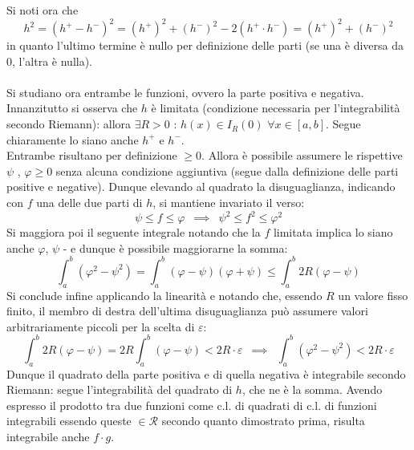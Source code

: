\documentclass[10pt, oneside]{book}
\theoremstyle{plain}
\begin{document}
Si noti ora che 
\[h^2 = (h^+ - h^-)^2 = (h^+)^2 + (h^-)^2 - 2 (h^+ \cdot h^-) = (h^+)^2 + (h^-)^2\]
in quanto l'ultimo termine è nullo per definizione delle parti (se una è diversa da $0$, l'altra è nulla).\\~\\
Si studiano ora entrambe le funzioni, ovvero la parte positiva e negativa.
\\Innanzitutto si osserva che $h$ è limitata (condizione necessaria per l'integrabilità secondo Riemann): allora $\exists R > 0$ : $h(x) \in I_R(0)$ $\forall x \in [a,b]$. Segue chiaramente lo siano anche $h^+$ e $h^-$. 
\\Entrambe risultano per definizione $\geq 0$. Allora è possibile assumere le rispettive $\psi$ , $\varphi \geq 0$ senza alcuna condizione aggiuntiva (segue dalla definizione delle parti positive e negative). Dunque elevando al quadrato la disuguaglianza, indicando con $f$ una delle due parti di $h$, si mantiene invariato il verso:
\[\psi \leq f \leq \varphi \enspace \implies \enspace \psi^2 \leq f^2 \leq \varphi^2\]
Si maggiora poi il seguente integrale notando che la $f$ limitata implica lo siano anche $\varphi$, $\psi$ - e dunque è possibile maggiorarne la somma:
\[\int_a^b (\varphi^2 - \psi^2) = \int_a^b(\varphi - \psi) (\varphi + \psi) \leq \int_a^b 2R (\varphi - \psi)\]
Si conclude infine applicando la linearità e notando che, essendo $R$ un valore fisso finito, il membro di destra dell'ultima disuguaglianza può assumere valori arbitrariamente piccoli per la scelta di $\varepsilon$:
\[\int_a^b 2R (\varphi - \psi) = 2R \int_a^b (\varphi - \psi) < 2R \cdot \varepsilon \enspace \implies \enspace \int_a^b (\varphi^2 - \psi^2) < 2R \cdot \varepsilon\]
Dunque il quadrato della parte positiva e di quella negativa è integrabile secondo Riemann: segue l'integrabilità del quadrato di $h$, che ne è la somma. Avendo espresso il prodotto tra due funzioni come c.l. di quadrati di c.l. di funzioni integrabili essendo queste $\in \mathcal{R}$ secondo quanto dimostrato prima, risulta integrabile anche $f \cdot g$.
\end{document}

